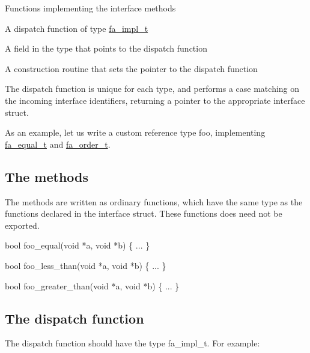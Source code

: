 \begin{DoxyItemize}
\item Functions implementing the interface methods
\item A dispatch function of type \hyperlink{group___fa_gac13cc6d4ef02b8763045164333cfd763}{fa\-\_\-impl\-\_\-t}
\item A field in the type that points to the dispatch function
\item A construction routine that sets the pointer to the dispatch function
\end{DoxyItemize}

The dispatch function is unique for each type, and performs a case matching on the incoming interface identifiers, returning a pointer to the appropriate interface struct.

As an example, let us write a custom reference type {\ttfamily foo}, implementing \hyperlink{structfa__equal__t}{fa\-\_\-equal\-\_\-t} and \hyperlink{structfa__order__t}{fa\-\_\-order\-\_\-t}.\hypertarget{md__interfaces_Methods}{}\subsection{The methods}\label{md__interfaces_Methods}
The methods are written as ordinary functions, which have the same type as the functions declared in the interface struct. These functions does need not be exported.


\begin{DoxyCode}
\textcolor{keywordtype}{bool} foo\_equal(\textcolor{keywordtype}{void} *a, \textcolor{keywordtype}{void} *b)
\{
    ...
\}

\textcolor{keywordtype}{bool} foo\_less\_than(\textcolor{keywordtype}{void} *a, \textcolor{keywordtype}{void} *b)
\{
    ...
\}

\textcolor{keywordtype}{bool} foo\_greater\_than(\textcolor{keywordtype}{void} *a, \textcolor{keywordtype}{void} *b)
\{
    ...
\}
\end{DoxyCode}
\hypertarget{md__interfaces_Dispatch}{}\subsection{The dispatch function}\label{md__interfaces_Dispatch}
The dispatch function should have the type fa\-\_\-impl\-\_\-t. For example\-:


